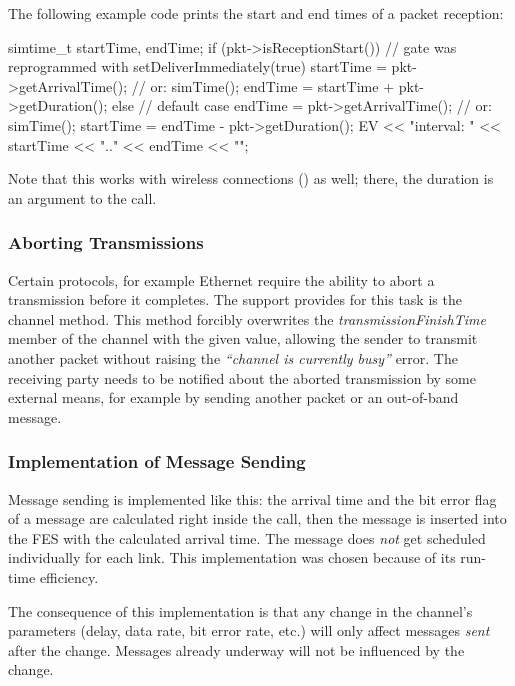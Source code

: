 \begin{ned}
The following example code prints the start and end times of a packet reception:

\begin{cpp}
simtime_t startTime, endTime;
if (pkt->isReceptionStart()) {
    // gate was reprogrammed with setDeliverImmediately(true)
    startTime = pkt->getArrivalTime(); // or: simTime();
    endTime = startTime + pkt->getDuration();
}
else {
    // default case
    endTime = pkt->getArrivalTime(); // or: simTime();
    startTime = endTime - pkt->getDuration();
}
EV << "interval: " << startTime << ".." << endTime << "\n";
\end{cpp}

Note that this works with wireless connections ()
as well; there, the duration is an argument to the 
call.

\subsubsection{Aborting Transmissions}
\label{sec:simple-modules:aborting-transmissions}

Certain protocols, for example Ethernet require the ability to abort
a transmission before it completes. The support {\opp} provides
for this task is the  channel method.
This method forcibly overwrites the \textit{transmissionFinishTime}
member of the channel with the given value, allowing the sender to transmit
another packet without raising the \textit{``channel is currently busy''}
error. The receiving party needs to be notified about the aborted transmission
by some external means, for example by sending another packet or an
out-of-band message.

\subsubsection{Implementation of Message Sending}
\label{sec:simple-modules:implementation-of-message-sending}

Message sending is implemented like this: the arrival time
and the bit error flag of a message are calculated right inside
the  call, then the message is inserted into the FES
with the calculated arrival time. The message does \textit{not} get scheduled
individually for each link. This implementation was chosen because of its
run-time efficiency.

\begin{note}
   The consequence of this implementation is that any change in the
   channel's parameters (delay, data rate, bit error rate, etc.) will only affect
   messages \textit{sent} after the change. Messages already underway will not
   be influenced by the change.


\end{note}
\end{ned}
